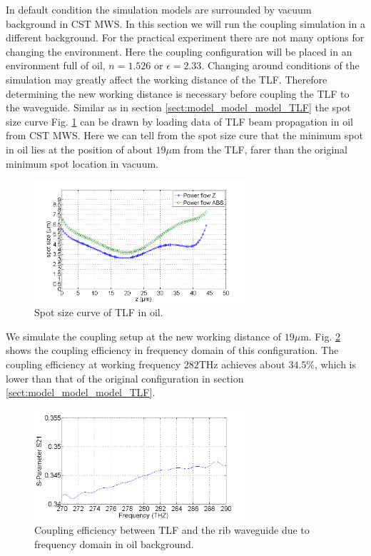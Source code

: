In default condition the simulation models are surrounded by vacuum background in CST MWS.
In this section we will run the coupling simulation in a different background. For the practical experiment there are not many options for changing the environment. Here the coupling configuration will be placed in an environment full of oil, $n=1.526$ or $\epsilon=2.33$. Changing around conditions of the simulation may greatly affect the working distance of the TLF. Therefore determining the new working distance is necessary before coupling the TLF to the waveguide.  Similar as in section \ref{sect:model_model_model_TLF} the spot size curve Fig. \ref{fig:oil_spot_curve} can be drawn by loading data of TLF beam propagation in oil from CST MWS. Here we can tell from the spot size cure that the minimum spot in oil lies at the position of about $19\mu$m from the TLF, farer than the original minimum spot location in vacuum.\\    

\begin{figure}[!ht]
\centering
\includegraphics[width=0.7\textwidth]{bilder/spot_curve_oil}
\caption{Spot size curve of TLF in oil.}
\label{fig:oil_spot_curve}
\end{figure}
We simulate the coupling setup at the new working distance of $19\mu$m. Fig. \ref{fig:oil_coupling_curve} shows the coupling efficiency in frequency domain of this configuration. The coupling efficiency at working frequency $282$THz achieves about $34.5\%$, which is lower than that of the original configuration in section \ref{sect:model_model_model_TLF}.\\

\begin{figure}[!ht]
\centering
\includegraphics[width=0.7\textwidth]{bilder/s21_oil_curve}
\caption{Coupling efficiency between TLF and the rib waveguide due to frequency domain in oil background.}
\label{fig:oil_coupling_curve}
\end{figure}